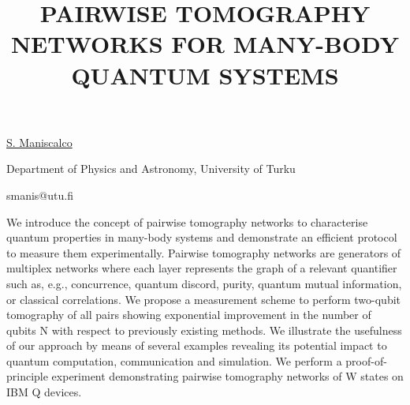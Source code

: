 \title{PAIRWISE TOMOGRAPHY NETWORKS FOR MANY-BODY QUANTUM SYSTEMS}

\underline{S. Maniscalco} 

{\normalsize{\vspace{-4mm}
Department of Physics and Astronomy, University of Turku



\email smanis@utu.fi}}

We introduce the concept of pairwise tomography networks to characterise quantum properties in many-body systems and demonstrate an efficient protocol to measure them experimentally. Pairwise tomography networks are generators of multiplex networks where each layer represents the graph of a relevant quantifier such as, e.g., concurrence, quantum discord, purity, quantum mutual information, or classical correlations. We propose a measurement scheme to perform two-qubit tomography of all pairs showing exponential improvement in the number of qubits N with respect to previously existing methods. We illustrate the usefulness of our approach by means of several examples revealing its potential impact to quantum computation, communication and simulation. We perform a proof-of-principle experiment demonstrating pairwise tomography networks of W states on IBM Q devices.

\vspace{\baselineskip}